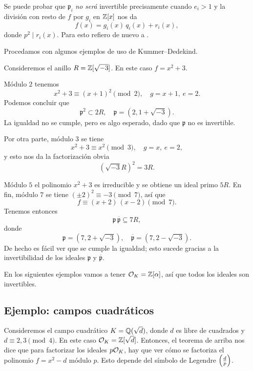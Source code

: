 \begin{comentario}
  Se puede probar que $\mathfrak{p}_i$ \emph{no será} invertible precisamente
  cuando $e_i > 1$ y la división con resto de $f$ por $g_i$ en $\mathbb{Z} [x]$ nos da
  $$f (x) = g_i (x) \, q_i (x) + r_i (x),$$
  donde $p^2 \mid r_i (x)$. Para esto refiero de nuevo a \cite{Stevenhagen-NR}.
\end{comentario}

Procedamos con algunos ejemplos de uso de Kummer--Dedekind.

\begin{ejemplo}
  Consideremos el anillo $R = \mathbb{Z} [\sqrt{-3}]$. En este caso $f = x^2 + 3$.

  Módulo $2$ tenemos
  $$x^2 + 3 \equiv (x+1)^2 \pmod{2}, \quad g = x+1, ~ e = 2.$$
  Podemos concluir que
  \[ \mathfrak{p}^2 \subset 2 R, \quad
     \mathfrak{p} = (2, 1 + \sqrt{-3}). \]
  La igualdad no se cumple, pero es algo esperado, dado que $\mathfrak{p}$
  no es invertible.

  Por otra parte, módulo $3$ se tiene
  $$x^2 + 3 \equiv x^2 \pmod{3}, \quad g = x, ~ e = 2,$$
  y esto nos da la factorización obvia
  $$(\sqrt{-3} R)^2 = 3R.$$

  Módulo $5$ el polinomio $x^2 + 3$ es irreducible y se obtiene un ideal primo
  $5 R$. En fin, módulo $7$ se tiene $(\pm 2)^2 \equiv -3 \pmod{7}$, así que
  $$f \equiv (x + 2)\,(x - 2) \pmod{7}.$$
  Tenemos entonces
  $$\mathfrak{p} \, \overline{\mathfrak{p}} \subseteq 7R,$$
  donde
  \[ \mathfrak{p} = (7, 2 + \sqrt{-3}), \quad
     \overline{\mathfrak{p}} = (7, 2 - \sqrt{-3}). \]
     De hecho es fácil ver que se cumple la igualdad; esto sucede gracias
     a la invertibilidad de los ideales $\mathfrak{p}$ y
     $\overline{\mathfrak{p}}$.
\end{ejemplo}

En los siguientes ejemplos vamos a tener $\mathcal{O}_K = \mathbb{Z} [\alpha]$, así que todos
los ideales son invertibles.

\subsection{Ejemplo: campos cuadráticos}

Consideremos el campo cuadrático $K = \mathbb{Q} (\sqrt{d})$, donde $d$ es libre de
cuadrados y $d \equiv 2,3\pmod{4}$. En este caso $\mathcal{O}_K = \mathbb{Z} [\sqrt{d}]$.
Entonces, el teorema de arriba nos dice que para factorizar los ideales
$p \mathcal{O}_K$, hay que ver cómo se factoriza el polinomio $f = x^2 - d$ módulo
$p$. Esto depende del símbolo de Legendre $\left(\frac{d}{p}\right)$.

